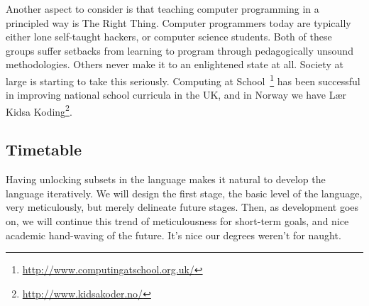 Another aspect to consider is that teaching computer programming in a 
principled way is The Right Thing. Computer programmers today are typically 
either lone self-taught hackers, or computer science students. Both of these 
groups suffer setbacks from learning to program through pedagogically unsound 
methodologies. Others never make it to an enlightened state at all. Society at 
large is starting to take this seriously. Computing at 
School~\footnote{\url{http://www.computingatschool.org.uk/}} has been 
successful in improving national school curricula in the UK, and in Norway we 
have Lær Kidsa Koding\footnote{\url{http://www.kidsakoder.no/}}.

\subsection{Timetable}
Having unlocking subsets in the language makes it natural to develop the 
language iteratively. We will design the first stage, the basic level of the 
language, very meticulously, but merely delineate future stages. Then, as 
development goes on, we will continue this trend of meticulousness for 
short-term goals, and nice academic hand-waving of the future. It's nice our 
degrees weren't for naught.
